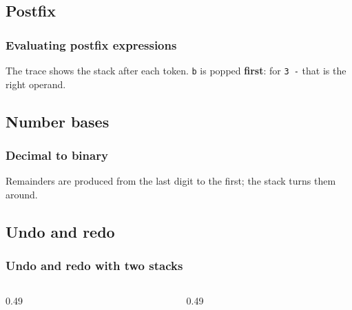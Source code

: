 \documentclass[aspectratio=169,10pt,compress]{beamer}
\begin{document}
\subsection[Postfix]{Postfix}




\begin{frame}[t,fragile] \frametitle{Evaluating postfix expressions}

  \vspace{0.2em}
  \small The trace shows the stack after each token. \texttt{b} is popped \textbf{first}: for \texttt{3 -} that is the right operand.
\end{frame}

\subsection[Binary]{Number bases}




\begin{frame}[t,fragile] \frametitle{Decimal to binary}

  \vspace{0.2em}
  \small Remainders are produced from the last digit to the first; the stack turns them around.
\end{frame}

\subsection[Undo]{Undo and redo}




\begin{frame}[t,fragile] \frametitle{Undo and redo with two stacks}
  \begin{columns}[T]
    \begin{column}{0.49\textwidth}
    \end{column}
    \begin{column}{0.49\textwidth}
    \end{column}
  \end{columns}
\end{frame}
\end{document}
